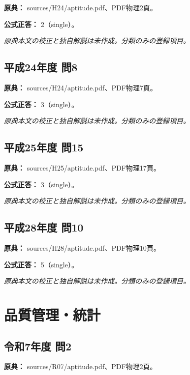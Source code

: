 \noindent\textbf{原典：} sources/H24/aptitude.pdf、PDF物理2頁。

\textbf{公式正答：} 2（single）。

\par\textit{原典本文の校正と独自解説は未作成。分類のみの登録項目。}

\subsection{平成24年度 問8}
\label{q:h24-reg-apt-08}

\noindent\textbf{原典：} sources/H24/aptitude.pdf、PDF物理7頁。

\textbf{公式正答：} 3（single）。

\par\textit{原典本文の校正と独自解説は未作成。分類のみの登録項目。}

\subsection{平成25年度 問15}
\label{q:h25-reg-apt-15}

\noindent\textbf{原典：} sources/H25/aptitude.pdf、PDF物理17頁。

\textbf{公式正答：} 3（single）。

\par\textit{原典本文の校正と独自解説は未作成。分類のみの登録項目。}

\subsection{平成28年度 問10}
\label{q:h28-reg-apt-10}

\noindent\textbf{原典：} sources/H28/aptitude.pdf、PDF物理10頁。

\textbf{公式正答：} 5（single）。

\par\textit{原典本文の校正と独自解説は未作成。分類のみの登録項目。}

\section{品質管理・統計}

\subsection{令和7年度 問2}
\label{q:r07-reg-apt-02}

\noindent\textbf{原典：} sources/R07/aptitude.pdf、PDF物理2頁。

